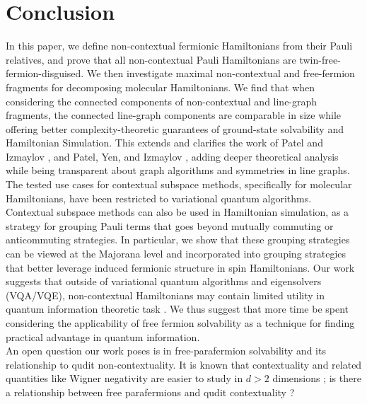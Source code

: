 \documentclass[%
 aip,
 amsmath,amssymb,
 reprint,%
]{revtex4-1}
\begin{document}
\section{Conclusion}
\label{sec:conclusion}

\indent In this paper, we define non-contextual fermionic Hamiltonians from their Pauli relatives, and prove that all non-contextual Pauli Hamiltonians are twin-free-fermion-disguised. We then investigate maximal non-contextual and free-fermion fragments for decomposing molecular Hamiltonians. We find that when considering the connected components of non-contextual and line-graph fragments, the connected line-graph components are comparable in size while offering better complexity-theoretic guarantees of ground-state solvability and Hamiltonian Simulation. This extends and clarifies the work of Patel and Izmaylov \cite{patel2024exactly}, and Patel, Yen, and Izmaylov \cite{patel2023extensionexactlysolvablehamiltoniansusing}, adding deeper theoretical analysis while being transparent about graph algorithms and symmetries in line graphs. \\
\indent The tested use cases for contextual subspace methods, specifically for molecular Hamiltonians, have been restricted to variational quantum algorithms. Contextual subspace methods can also be used in Hamiltonian simulation, as a strategy for grouping Pauli terms that goes beyond mutually commuting or anticommuting strategies. In particular, we show that these grouping strategies can be viewed at the Majorana level and incorporated into grouping strategies that better leverage induced fermionic structure in spin Hamiltonians. Our work suggests that outside of variational quantum algorithms and eigensolvers (VQA/VQE), non-contextual Hamiltonians may contain limited utility in quantum information theoretic task \cite{patel2023extensionexactlysolvablehamiltoniansusing, Kirby_ContextVQE, Ralli_ContextVQE, Weaving_ContextVQE}. We thus suggest that more time be spent considering the applicability of free fermion solvability as a technique for finding practical advantage in quantum information.   \\ 
\indent An open question our work poses is in free-parafermion solvability \cite{Mann_2025} and its relationship to qudit non-contextuality. It is known that contextuality and related quantities like Wigner negativity are easier to study in $d>2$ dimensions \cite{Howard_ContextMagic, Raussendorf_2017, PhysRevA.85.062121, PhysRevA.70.062101}; is there a relationship between free parafermions and qudit contextuality \cite{Mann_2025}? \\ 
\end{document}
